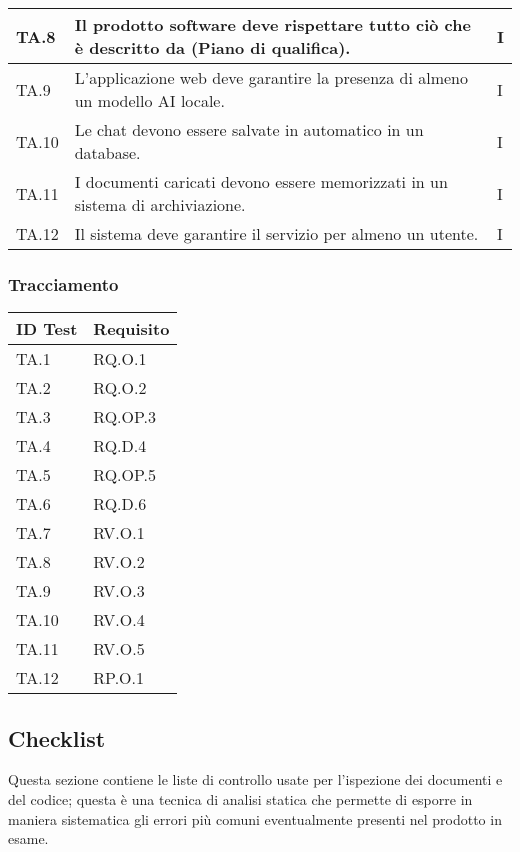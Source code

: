 {{{{{{{{{{\begin{tabularx}{\textwidth}{p{}|p{}|X}
    \hline
    TA.8 & Il prodotto software deve rispettare tutto ciò che è descritto da (Piano di qualifica). & I \\
    \hline
    TA.9 & L’applicazione web deve garantire la presenza di almeno un modello AI locale. & I \\
    \hline
    TA.10 & Le chat devono essere salvate in automatico in un database. & I \\
    \hline
    TA.11 & I documenti caricati devono essere memorizzati in un sistema di archiviazione. & I \\
    \hline
    TA.12 & Il sistema deve garantire il servizio per almeno un utente. & I \\
    \end{tabularx}}

    \subsubsection{Tracciamento}
    {\renewcommand{\arraystretch}{1.5}
    \begin{tabularx}{\textwidth}{p{}|X}
    \textbf{ID Test} & \textbf{Requisito}  \\
    \hline
    TA.1 & RQ.O.1 \\
    \hline
    TA.2 & RQ.O.2 \\
    \hline
    TA.3 & RQ.OP.3 \\
    \hline
    TA.4 & RQ.D.4 \\
    \hline
    TA.5 & RQ.OP.5 \\
    \hline
    TA.6 & RQ.D.6 \\
    \hline
    TA.7 & RV.O.1 \\
    \hline
    TA.8 & RV.O.2 \\
    \hline
    TA.9 & RV.O.3 \\
    \hline
    TA.10 & RV.O.4 \\
    \hline
    TA.11 & RV.O.5 \\
    \hline
    TA.12 & RP.O.1 \\
    \end{tabularx}}


\subsection{Checklist }
Questa sezione contiene le liste di controllo usate per l'ispezione dei documenti e del codice; questa è una tecnica di analisi statica che permette di esporre in maniera sistematica gli errori più comuni eventualmente presenti nel prodotto in esame.
}}}}}}}}}
